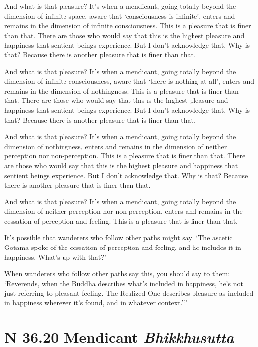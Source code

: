 \documentclass[12pt,openany]{book}%
\newcommand*{\suttatitleacronym}[1]{\smaller[2]{#1}\vspace*{.3em}}
\newcommand*{\suttatitletranslation}[1]{\linebreak{#1}}
\newcommand*{\suttatitleroot}[1]{\linebreak\smaller[2]\itshape{#1}}
\newcommand*{\tocacronym}[1]{\hspace*{-3.3em}{#1}\quad}
\newcommand*{\toctranslation}[1]{#1}
\newcommand*{\tocroot}[1]{(\textit{#1})}
\begin{document}
And what is that pleasure? It’s when a mendicant, going totally beyond the dimension of infinite space, aware that ‘consciousness is infinite’, enters and remains in the dimension of infinite consciousness. This is a pleasure that is finer than that. There are those who would say that this is the highest pleasure and happiness that sentient beings experience. But I don’t acknowledge that. Why is that? Because there is another pleasure that is finer than that. 

And what is that pleasure? It’s when a mendicant, going totally beyond the dimension of infinite consciousness, aware that ‘there is nothing at all’, enters and remains in the dimension of nothingness. This is a pleasure that is finer than that. There are those who would say that this is the highest pleasure and happiness that sentient beings experience. But I don’t acknowledge that. Why is that? Because there is another pleasure that is finer than that. 

And what is that pleasure? It’s when a mendicant, going totally beyond the dimension of nothingness, enters and remains in the dimension of neither perception nor non-perception. This is a pleasure that is finer than that. There are those who would say that this is the highest pleasure and happiness that sentient beings experience. But I don’t acknowledge that. Why is that? Because there is another pleasure that is finer than that. 

And what is that pleasure? It’s when a mendicant, going totally beyond the dimension of neither perception nor non-perception, enters and remains in the cessation of perception and feeling. This is a pleasure that is finer than that. 

It’s possible that wanderers who follow other paths might say: ‘The ascetic Gotama spoke of the cessation of perception and feeling, and he includes it in happiness. What’s up with that?’ 

When wanderers who follow other paths say this, you should say to them: ‘Reverends, when the Buddha describes what’s included in happiness, he’s not just referring to pleasant feeling. The Realized One describes pleasure as included in happiness wherever it’s found, and in whatever context.’” 

%
\section*{{\suttatitleacronym SN 36.20}{\suttatitletranslation A Mendicant }{\suttatitleroot Bhikkhusutta}}
\addcontentsline{toc}{section}{\tocacronym{SN 36.20} \toctranslation{A Mendicant } \tocroot{Bhikkhusutta}}
\end{document}
